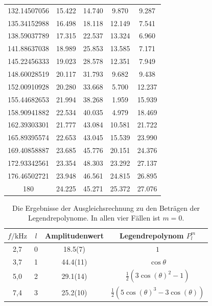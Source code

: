 \begin{table}
\begin{tabular}{S[round-precision=1] S[] S[] S[] S[]}
132.14507056 & 15.422 & 14.740 & 9.870  & 9.287 \\
135.34152988 & 16.498 & 18.118 & 12.149 & 7.541 \\
138.59037789 & 17.315 & 22.537 & 13.324 & 6.960 \\
141.88637038 & 18.989 & 25.853 & 13.585 & 7.171 \\
145.22456333 & 19.023 & 28.578 & 12.351 & 7.949 \\
148.60028519 & 20.117 & 31.793 & 9.682  & 9.438 \\
152.00910928 & 20.280 & 33.668 & 5.700  & 12.237 \\
155.44682653 & 21.994 & 38.268 & 1.959  & 15.939 \\
158.90941882 & 22.534 & 40.035 & 4.979  & 18.469 \\
162.39303301 & 21.777 & 43.084 & 10.581 & 21.722 \\
165.89395574 & 22.653 & 43.045 & 15.539 & 23.990 \\
169.40858887 & 23.685 & 45.776 & 20.151 & 24.376 \\
172.93342561 & 23.354 & 48.303 & 23.292 & 27.137 \\
176.46502721 & 23.948 & 46.561 & 24.815 & 26.895 \\
180 & 24.225 & 45.271 & 25.372 & 27.076 \\

\bottomrule
\end{tabular}\end{table}



\begin{table}\caption{Die Ergebnisse der Ausgleichsrechnung zu den Beträgen der Legendrepolynome. In allen vier Fällen ist $m = 0$.}
    \label{tab:fit}
    \centering
     \begin{tabular}{c c S[round-precision=1] c} 
    \toprule
{$f / \si{\kilo\hertz}$} & {$l$} & {Amplitudenwert} & Legendrepolynom $P_l^m$ \\
,7     &   0   &  18.5(7)  &   $1$  \\
3,7     &   1   &  44.4(11) &   $\cos \theta$  \\
5,0     &   2   &  29.1(14) &   $\frac{1}{2}(3 \cos(\theta)^2 -1)$  \\ 
7,4     &   3   &  25.2(10) &   $\frac{1}{2} (5  \cos(\theta)^3 -3 \cos(\theta))$  \\

\bottomrule
\end{tabular}\end{table}

